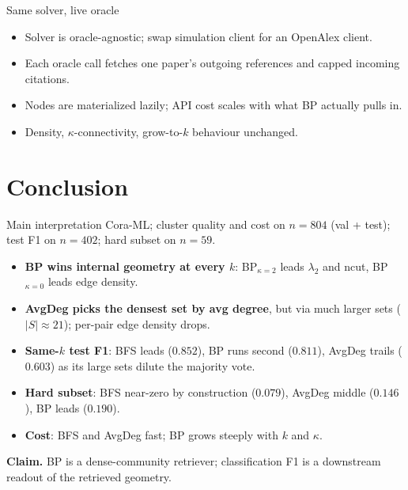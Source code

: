 \documentclass{beamer}
\begin{document}
\begin{frame}{Same solver, live oracle}
  \begin{itemize}
    \item Solver is oracle-agnostic; swap simulation client for an OpenAlex client.
    \item Each oracle call fetches one paper's outgoing references and capped incoming citations.
    \item Nodes are materialized lazily; API cost scales with what BP actually pulls in.
    \item Density, $\kappa$-connectivity, grow-to-$k$ behaviour unchanged.
  \end{itemize}
\end{frame}

\section{Conclusion}

\begin{frame}{Main interpretation}
  Cora-ML; cluster quality and cost on $n = 804$ (val + test); test F1 on $n = 402$; hard subset on $n = 59$.

  \vfill

  \begin{itemize}
    \item \textbf{BP wins internal geometry at every $k$}: BP$_{\kappa=2}$ leads $\lambda_2$ and ncut, BP$_{\kappa=0}$ leads edge density.
    \item \textbf{AvgDeg picks the densest set by avg degree}, but via much larger sets ($|S| \approx 21$); per-pair edge density drops.
    \item \textbf{Same-$k$ test F1}: BFS leads ($0.852$), BP runs second ($0.811$), AvgDeg trails ($0.603$) as its large sets dilute the majority vote.
    \item \textbf{Hard subset}: BFS near-zero by construction ($0.079$), AvgDeg middle ($0.146$), BP leads ($0.190$).
    \item \textbf{Cost}: BFS and AvgDeg fast; BP grows steeply with $k$ and $\kappa$.
  \end{itemize}

  \vfill

  \textbf{Claim.} BP is a dense-community retriever; classification F1 is a downstream readout of the retrieved geometry.
\end{frame}
\end{document}
